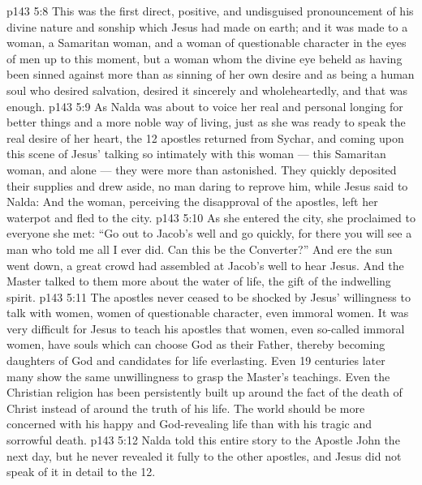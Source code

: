 \vs p143 5:8 This was the first direct, positive, and undisguised pronouncement of his divine nature and sonship which Jesus had made on earth; and it was made to a woman, a Samaritan woman, and a woman of questionable character in the eyes of men up to this moment, but a woman whom the divine eye beheld as having been sinned against more than as sinning of her own desire and as  being a human soul who desired salvation, desired it sincerely and wholeheartedly, and that was enough.
\vs p143 5:9 As Nalda was about to voice her real and personal longing for better things and a more noble way of living, just as she was ready to speak the real desire of her heart, the 12 apostles returned from Sychar, and coming upon this scene of Jesus’ talking so intimately with this woman --- this Samaritan woman, and alone --- they were more than astonished. They quickly deposited their supplies and drew aside, no man daring to reprove him, while Jesus said to Nalda:  And the woman, perceiving the disapproval of the apostles, left her waterpot and fled to the city.
\vs p143 5:10 As she entered the city, she proclaimed to everyone she met: “Go out to Jacob’s well and go quickly, for there you will see a man who told me all I ever did. Can this be the Converter?” And ere the sun went down, a great crowd had assembled at Jacob’s well to hear Jesus. And the Master talked to them more about the water of life, the gift of the indwelling spirit.
\vs p143 5:11 The apostles never ceased to be shocked by Jesus’ willingness to talk with women, women of questionable character, even immoral women. It was very difficult for Jesus to teach his apostles that women, even so\hyp{}called immoral women, have souls which can choose God as their Father, thereby becoming daughters of God and candidates for life everlasting. Even 19 centuries later many show the same unwillingness to grasp the Master’s teachings. Even the Christian religion has been persistently built up around the fact of the death of Christ instead of around the truth of his life. The world should be more concerned with his happy and God\hyp{}revealing life than with his tragic and sorrowful death.
\vs p143 5:12 Nalda told this entire story to the Apostle John the next day, but he never revealed it fully to the other apostles, and Jesus did not speak of it in detail to the 12.
